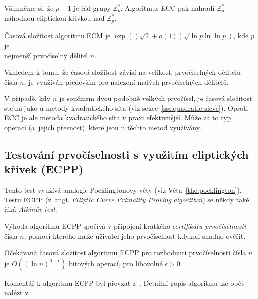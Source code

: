 \documentclass[
  program=infoi,
  biblatex=false,
  figures=true,
  glossaries,
  tables=false,
  sourcecodes=true,
  index
]{kidiplom}
\begin{document}
        Všimněme si, že $p-1$ je řád grupy $\mathbb{Z}^*_p$.
        Algoritmus ECC pak nahradí $\mathbb{Z}^*_p$ náhodnou eliptickou křivkou nad $\mathbb{Z}^*_p$.

        \begin{theorem}
            Časová složitost algoritmu ECM je $\exp{((\sqrt{2} + o(1)) \sqrt{\ln{p} \ln \ln{p}})}$, kde $p$ je \\ nejmenší prvočíselný
            dělitel $n$.
        \end{theorem}

        Vzhledem k tomu, že časová složitost závisí na velikosti prvočíselných dělitelů čísla $n$, je využíván především pro nalezení
        malých prvočíselných dělitelů.

        V případě, kdy $n$ je součinem dvou podobně velkých prvočísel, je časová složitost stejná jako u
        metody kvadratického síta (viz sekce~\ref{sss:quadratic-sieve}).
        Oproti ECC je ale metoda kvadratického síta v praxi efektivnější.
        Může za to typ operací (a~jejich přesnost), které jsou u těchto metod využívány.


    \subsection{Testování prvočíselnosti s využitím eliptických křivek (ECPP)}

        Tento test využívá analogie Pocklingtonovy věty (viz Věta~\ref{the:pocklington}).
        Testu ECPP (z~angl. \emph{Elliptic Curve Primality Proving algorithm}) se někdy také říká \emph{Atkinův test}.

        Výhoda algoritmu ECPP spočívá v připojení krátkého \emph{certifikátu prvočíselnosti} čísla $n$, pomocí
        kterého může uživatel jeho prvočíselnost kdykoli snadno ověřit.

        \begin{theorem}
            Očekávaná časová složitost algoritmu ECPP pro rozhodnutí prvočíselnosti čísla $n$
            je $O((\ln{n})^{6+\epsilon})$ bitových operací, pro libovolné $\epsilon > 0$.
        \end{theorem}
        
        Komentář k algoritmu ECPP byl převzat z~\cite{handbook}.
        Detailní popis algoritmu lze opět nalézt v~\cite{elliptic-curves}.

        \newpage

        
\end{document}
